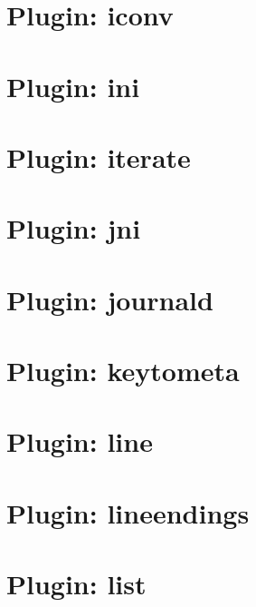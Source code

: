 \documentclass[twoside]{book}
\newcommand{\+}{\discretionary{\mbox{\scriptsize$\hookleftarrow$}}{}{}}
\begin{document}
\chapter{Plugin\+: iconv}
\label{md_src_plugins_iconv_README}
\hypertarget{md_src_plugins_iconv_README}{}

\chapter{Plugin\+: ini}
\label{md_src_plugins_ini_README}
\hypertarget{md_src_plugins_ini_README}{}

\chapter{Plugin\+: iterate}
\label{md_src_plugins_iterate_README}
\hypertarget{md_src_plugins_iterate_README}{}

\chapter{Plugin\+: jni}
\label{md_src_plugins_jni_README}
\hypertarget{md_src_plugins_jni_README}{}

\chapter{Plugin\+: journald}
\label{md_src_plugins_journald_README}
\hypertarget{md_src_plugins_journald_README}{}

\chapter{Plugin\+: keytometa}
\label{md_src_plugins_keytometa_README}
\hypertarget{md_src_plugins_keytometa_README}{}

\chapter{Plugin\+: line}
\label{md_src_plugins_line_README}
\hypertarget{md_src_plugins_line_README}{}

\chapter{Plugin\+: lineendings}
\label{md_src_plugins_lineendings_README}
\hypertarget{md_src_plugins_lineendings_README}{}

\chapter{Plugin\+: list}
\label{md_src_plugins_list_README}
\hypertarget{md_src_plugins_list_README}{}

\end{document}
